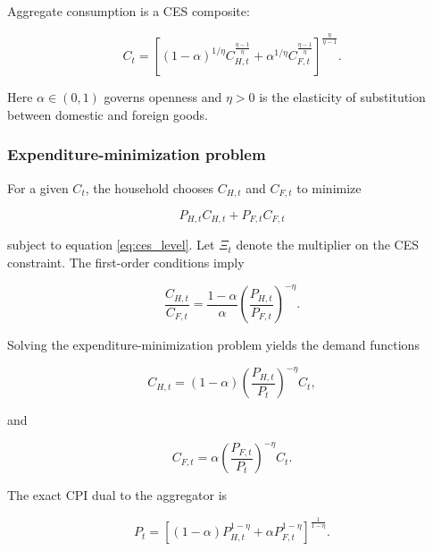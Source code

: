 Aggregate consumption is a CES composite:

\begin{equation}
C_t
=
\left[
(1-\alpha)^{1/\eta}
C_{H,t}^{\frac{\eta-1}{\eta}}
+
\alpha^{1/\eta}
C_{F,t}^{\frac{\eta-1}{\eta}}
\right]^{\frac{\eta}{\eta-1}}.
\label{eq:ces_level}
\end{equation}

Here \(\alpha\in(0,1)\) governs openness and \(\eta>0\) is the elasticity of
substitution between domestic and foreign goods.

\subsubsection{Expenditure-minimization problem}

For a given \(C_t\), the household chooses \(C_{H,t}\) and \(C_{F,t}\) to
minimize

\begin{equation}
P_{H,t}C_{H,t}+P_{F,t}C_{F,t}
\end{equation}

subject to equation \eqref{eq:ces_level}. Let \(\Xi_t\) denote the multiplier
on the CES constraint. The first-order conditions imply

\begin{equation}
\frac{C_{H,t}}{C_{F,t}}
=
\frac{1-\alpha}{\alpha}
\left(
\frac{P_{H,t}}{P_{F,t}}
\right)^{-\eta}.
\end{equation}

Solving the expenditure-minimization problem yields the demand functions

\begin{equation}
C_{H,t}
=
(1-\alpha)
\left(
\frac{P_{H,t}}{P_t}
\right)^{-\eta}
C_t,
\label{eq:ch_level}
\end{equation}

and

\begin{equation}
C_{F,t}
=
\alpha
\left(
\frac{P_{F,t}}{P_t}
\right)^{-\eta}
C_t.
\label{eq:cf_level}
\end{equation}

The exact CPI dual to the aggregator is

\begin{equation}
P_t
=
\left[
(1-\alpha)P_{H,t}^{1-\eta}
+
\alpha P_{F,t}^{1-\eta}
\right]^{\frac{1}{1-\eta}}.
\label{eq:cpi_level}
\end{equation}

